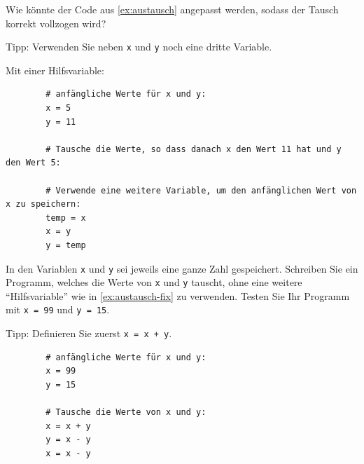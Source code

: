 \begin{myexercise}\label{ex:austausch-fix}
	Wie könnte der Code aus \cref{ex:austausch} angepasst werden, sodass der Tausch korrekt vollzogen wird?

	Tipp: Verwenden Sie neben \lstinline|x| und \lstinline|y| noch eine dritte Variable.
	\begin{myanswer}
		Mit einer Hilfsvariable:
		\begin{lstlisting}
		# anfängliche Werte für x und y:
		x = 5
		y = 11

		# Tausche die Werte, so dass danach x den Wert 11 hat und y den Wert 5:

		# Verwende eine weitere Variable, um den anfänglichen Wert von x zu speichern:
		temp = x
		x = y
		y = temp
	\end{lstlisting}
	\end{myanswer}
\end{myexercise}

\begin{mychallenge}\label{mychallenge:tausch_mit_2_variablen}
	In den Variablen \lstinline|x| und \lstinline|y| sei jeweils eine ganze Zahl gespeichert. Schreiben Sie ein Programm, welches die Werte von \lstinline|x| und \lstinline|y| tauscht, ohne eine weitere \enquote{Hilfsvariable} wie in \cref{ex:austausch-fix} zu verwenden. Testen Sie Ihr Programm mit \lstinline|x = 99| und \lstinline|y = 15|.

	Tipp: Definieren Sie zuerst \lstinline|x = x + y|.
	\begin{myanswer}
		\begin{lstlisting}
		# anfängliche Werte für x und y:
		x = 99
		y = 15

		# Tausche die Werte von x und y:
		x = x + y
		y = x - y
		x = x - y
	\end{lstlisting}
	\end{myanswer}
\end{mychallenge}

